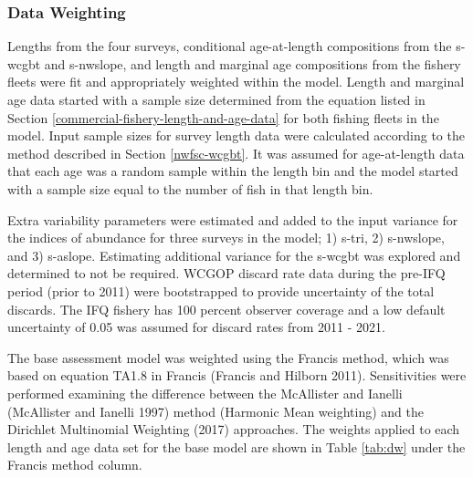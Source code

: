 \documentclass[11pt,
  english,
  a4paper,
]{article}
\begin{document}

\hypertarget{data-weighting}{%
\subsubsection{Data Weighting}\label{data-weighting}}

\leavevmode\tagmcend\tagstructend


Lengths from the four surveys, conditional age-at-length compositions from the \gls{s-wcgbt} and \gls{s-nwslope}, and length and marginal age compositions from the fishery fleets were fit and appropriately weighted within the model. Length and marginal age data started with a sample size determined from the equation listed in Section \ref{commercial-fishery-length-and-age-data} for both fishing fleets in the model. Input sample sizes for survey length data were calculated according to the method described in Section \ref{nwfsc-wcgbt}. It was assumed for age-at-length data that each age was a random sample within the length bin and the model started with a sample size equal to the number of fish in that length bin.

\leavevmode\tagmcend\tagstructend\par


Extra variability parameters were estimated and added to the input variance for the indices of abundance for three surveys in the model; 1) \gls{s-tri}, 2) \gls{s-nwslope}, and 3) \gls{s-aslope}. Estimating additional variance for the \gls{s-wcgbt} was explored and determined to not be required. WCGOP discard rate data during the pre-IFQ period (prior to 2011) were bootstrapped to provide uncertainty of the total discards. The IFQ fishery has 100 percent observer coverage and a low default uncertainty of 0.05 was assumed for discard rates from 2011 - 2021.

\leavevmode\tagmcend\tagstructend\par


The base assessment model was weighted using the Francis method, which was based on equation TA1.8 in Francis {(Francis and Hilborn 2011)\leavevmode\tagmcend\tagstructend}. Sensitivities were performed examining the difference between the McAllister and Ianelli {(McAllister and Ianelli 1997)\leavevmode\tagmcend\tagstructend} method (Harmonic Mean weighting) and the Dirichlet Multinomial Weighting {(2017)\leavevmode\tagmcend\tagstructend} approaches. The weights applied to each length and age data set for the base model are shown in Table \ref{tab:dw} under the Francis method column.
\end{document}
